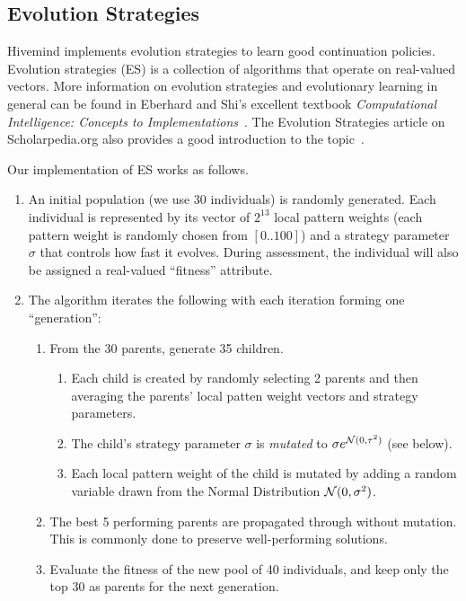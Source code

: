 \documentclass{acm_proc_article-sp}
\begin{document}
\subsection{Evolution Strategies}
\label{s:es}

Hivemind implements evolution strategies to learn good continuation policies.
Evolution strategies (ES) is a collection of algorithms that operate on real-valued vectors. 
More information on evolution strategies and evolutionary learning in general can be found in Eberhard and Shi's excellent textbook \emph{Computational Intelligence: Concepts to Implementations}~\cite{eberhart2007computational}. 
The Evolution Strategies article on Scholarpedia.org also provides a good introduction to the topic~\cite{Beyer:2007}.


Our implementation of ES works as follows.
\begin{enumerate}
\item An initial population (we use 30 individuals) is randomly generated. 
Each individual is represented by its vector of $2^{13}$ local pattern weights 
(each pattern weight is randomly chosen from $[0 .. 100]$)
and a strategy parameter $\sigma$ that controls how fast it evolves.
During assessment, the individual will also be assigned a real-valued ``fitness'' attribute.
\item The algorithm iterates the following with each iteration forming one ``generation'':
	\begin{enumerate}
	\item From the 30 parents, generate 35 children.
		\begin{enumerate}
		\item Each child is created by randomly selecting 2 parents and then 
		averaging the parents' local patten weight vectors and strategy parameters.
		\item	The child's strategy parameter $\sigma$ is \emph{mutated} to $\sigma e^{ {\cal N}(0,\tau^2)}$
			(see below).
		\item Each local pattern weight of the child is mutated by adding a random variable drawn from the Normal Distribution
		${\cal N}(0, \sigma^2)$.
		\end{enumerate}
	\item The best 5 performing parents are propagated through without mutation.  This is commonly done to preserve well-performing solutions. 
	\item Evaluate the fitness of the new pool of 40 individuals, and keep only the top 30 as parents for the next generation.
	\end{enumerate}
\end{enumerate}
\end{document}

